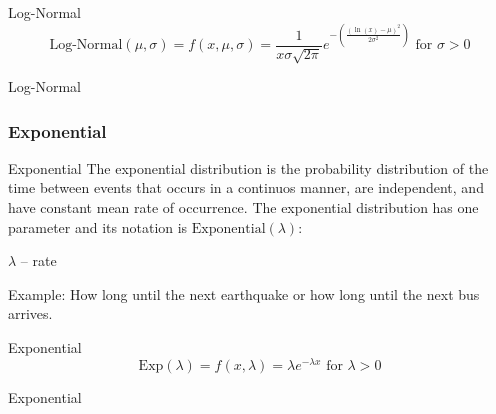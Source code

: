 \begin{frame}{Log-Normal}
	$$\text{Log-Normal}(\mu,\sigma) = f(x, \mu, \sigma) = \frac{1}{x \sigma{\sqrt{2\pi}}}e^{-\left({\frac {(\ln(x)-\mu)^2}{2 \sigma^2 }}\right)} \text{ for $\sigma > 0$}$$
\end{frame}

\begin{frame}{Log-Normal}
	\centering
\end{frame}

\subsubsection{Exponential}
\begin{frame}{Exponential}
	The exponential distribution is the probability distribution of the time
	between events that occurs in a continuos manner, are independent,
	and have constant mean rate of occurrence.
	\vfill
	The exponential distribution has one parameter and its notation is
	$\text{Exponential}(\lambda)$:
	\begin{vfilleditems}
		\item $\lambda$ -- rate
	\end{vfilleditems}
	\vfill
	Example: How long until the next earthquake or how long until the next bus arrives.
\end{frame}

\begin{frame}{Exponential}
	$$\text{Exp}(\lambda) = f(x, \lambda) = \lambda e^{-\lambda x} \text{ for $\lambda > 0$}$$
\end{frame}

\begin{frame}{Exponential}
	\centering
\end{frame}

